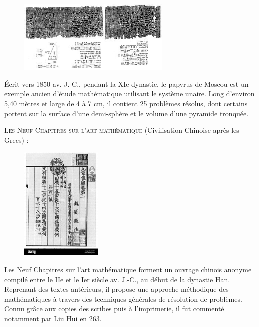 \vspace{.2cm}

\begin{figure} %
    \vspace{-0.65cm} %
    \includegraphics[width=0.65\textwidth]{../images/papyrus-moscou.jpg}
\end{figure}

Écrit vers 1850 av. J.-C., pendant la XIe dynastie, le papyrus de Moscou est un exemple ancien d’étude mathématique utilisant le système unaire. Long d’environ 5,40 mètres et large de 4 à 7 cm, il contient 25 problèmes résolus, dont certains portent sur la surface d’une demi-sphère et le volume d’une pyramide tronquée.


\newpage


\textsc{Les Neuf Chapitres sur l'art mathématique} (Civilisation Chinoise après les Grecs) : 

\vspace{.2cm}

\begin{figure} %
    \vspace{-0.65cm} %
    \includegraphics[width=0.35\textwidth]{../images/9chap.jpg}
\end{figure}

Les Neuf Chapitres sur l’art mathématique forment un ouvrage chinois anonyme compilé entre le IIe et le Ier siècle av. J.-C., au début de la dynastie Han. Reprenant des textes antérieurs, il propose une approche méthodique des mathématiques à travers des techniques générales de résolution de problèmes. Connu grâce aux copies des scribes puis à l’imprimerie, il fut commenté notamment par Liu Hui en 263.


\newpage

